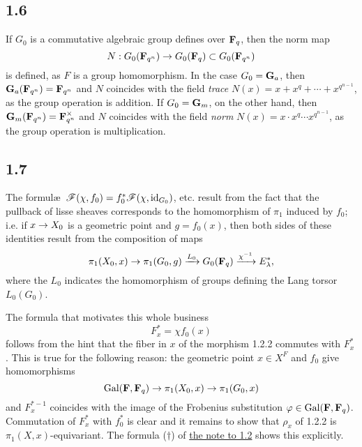 \documentclass[deligne.tex]{subfiles}
\begin{document}
\subsection*{1.6}\label{sommes:1.6} If $G_0$ is a commutative algebraic group defines over
$\mathbf{F}_q$, then the norm map
\begin{equation*}
N:G_0(\mathbf{F}_{q^n})\rightarrow G_0(\mathbf{F}_q)\subset G_0(\mathbf{F}_{q^n})\end{equation*}
is defined, as $F$ is a group homomorphism.
In the case $G_0=\mathbf{G}_a$, then $\mathbf{G}_a(\mathbf{F}_{q^n})=\mathbf{F}_{q^n}$
and $N$ coincides with the field \emph{trace}
$N(x)=x+x^q+\cdots+x^{q^{n-1}}$, as the group operation is
addition. If $G_0=\mathbf{G}_m$, on the other hand, then
$\mathbf{G}_m(\mathbf{F}_{q^n})=\mathbf{F}_{q^n}^\times$ and $N$ coincides with the field 
\emph{norm} $N(x)=x\cdot x^q\cdots x^{q^{n-1}}$, as the group operation is
multiplication.

\subsection*{1.7} The formul\ae\
$\mathscr F(\chi,f_0)=f_0^*\mathscr F(\chi,\operatorname{id}_{G_0})$, etc. result from the
fact that the pullback of lisse sheaves corresponds to the homomorphism of
$\pi_1$ induced by $f_0$; i.e. if $x\rightarrow X_0$ is a geometric point and 
$g=f_0(x)$, then both sides of these identities result from the composition 
of maps
\begin{equation*}
	\pi_1(X_0,x)\rightarrow\pi_1(G_0,g)\xrightarrow{L_0} G_0(\mathbf{F}_q)\xrightarrow{\chi^{-1}} E_\lambda^*,
\end{equation*}
where the $L_0$ indicates the homomorphism of groups defining the
Lang torsor $L_0(G_0)$.

The formula that motivates this whole business
\begin{equation*} F_x^*=\chi f_0(x)\end{equation*}
follows from the hint that the fiber in $x$ of the morphism 1.2.2 commutes
with $F_x^*$. This is true for the following reason: the geometric point 
$x\in X^F$ and $f_0$ give homomorphisms
\begin{equation*}	
	\operatorname{Gal}(\mathbf{F},\mathbf{F}_q)\rightarrow\pi_1(X_0,x)\rightarrow\pi_1(G_0,x)
\end{equation*}
and $F_x^{*-1}$ coincides with the image of the Frobenius substitution
$\varphi\in\operatorname{Gal}(\mathbf{F},\mathbf{F}_q)$. Commutation of $F_x^*$ with $f_0^*$ is clear 
and it remains to show that $\rho_x$ of 1.2.2 is $\pi_1(X,x)$-equivariant.
The formula ($\dagger$) of \hyperref[sec:st1.2]{the note to 1.2} shows this
explicitly.
\end{document}
